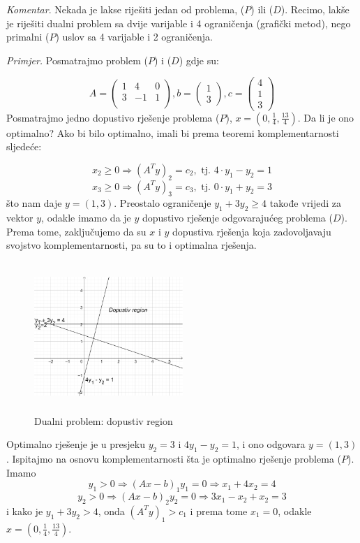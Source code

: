 \documentclass[a4paper, utf8, 11pt, colorlinks]{book}
\begin{document}
\emph{Komentar}.  Nekada je lakse riješiti jedan od problema, ($P$)  ili  ($D$).  Recimo, lakše je riješiti dualni problem sa dvije varijable i 4 ograničenja (grafički metod), nego primalni  ($P$)  uslov sa 4 varijable i 2 ograničenja. 

\emph{Primjer.} Posmatrajmo problem  ($P$)  i  ($D$)  gdje su:
 
$$      A = \left(\begin{array}{ccc}
          1 &  4 & 0 \\
          3 & -1 & 1 \\
      \end{array} \right ), b = \left (\begin{array}{c}
           1 \\
           3
      \end{array}\right ), c =\left ( \begin{array}{c}
           4  \\
           1  \\
           3
      \end{array} \right )
 $$
Posmatrajmo jedno dopustivo rješenje problema  ($P$), $x = (0, \frac{1}{4}, \frac{13}{4})$. Da li je ono optimalno? Ako bi bilo optimalno, imali bi prema teoremi komplementarnosti sljedeće:

$$x_2 \geq 0 \Rightarrow  (A^T y)_2  = c_2, \mbox{ tj. } 4 \cdot y_1 - y_2 = 1$$
$$x_3 \geq 0 \Rightarrow  (A^T y)_3  = c_3, \mbox{ tj. } 0 \cdot y_1 + y_2 = 3$$
što nam daje  $y = (1, 3)$. Preostalo ograničenje $y_1 + 3 y_2 \geq 4$ takođe vrijedi za vektor $y$, odakle imamo da je $y$ dopustivo rješenje odgovarajućeg problema  ($D$).  Prema tome, zaključujemo da su $x$ i $y$ dopustiva rješenja koja zadovoljavaju svojstvo komplementarnosti, pa su to i optimalna rješenja. 

\begin{figure}[!ht]
    \centering
     \includegraphics[width=160pt, height=160pt]{fig5.eps}
    \caption{Dualni problem: dopustiv region}
    \label{fig:fig5}
\end{figure}
Optimalno rješenje je u presjeku $y_2 = 3$ i $4y_1 - y_2 = 1$, i ono odgovara $y = (1, 3)$. Ispitajmo na osnovu komplementarnosti šta je optimalno rješenje problema ($P$). Imamo 
$$y_1 > 0 \Rightarrow (Ax - b)_1 y_1 = 0 \Rightarrow x_1 + 4 x_2 = 4 $$
$$y_2 > 0 \Rightarrow (Ax - b)_2 y_2 = 0 \Rightarrow 3x_1 - x_2 + x_2 = 3 $$
i kako je $y_1 + 3 y_2 > 4$, onda $(A^Ty)_1 > c_1$ i prema tome $x_1 =0$, 
odakle $x =(0, \frac{1}{4}, \frac{13}{4})$. 
\end{document}
